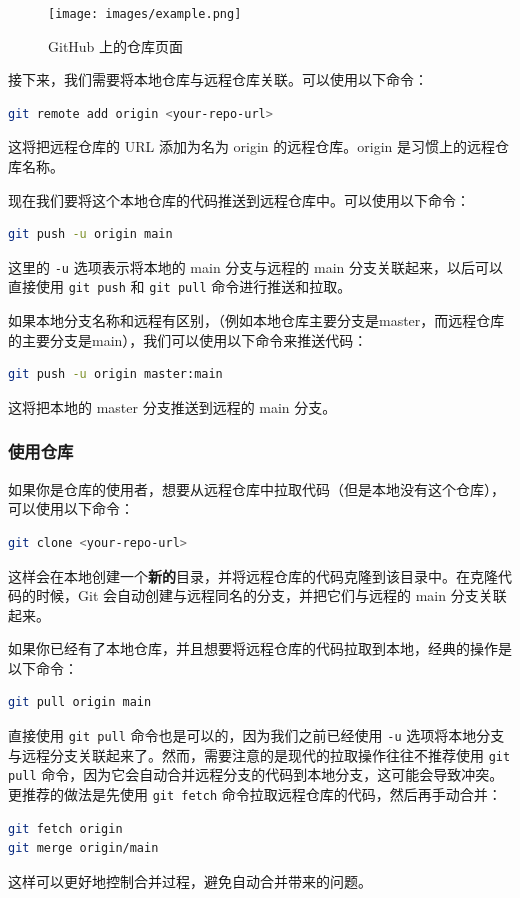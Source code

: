 \documentclass[../main.tex]{subfiles}
\begin{document}
\begin{figure}[htbp]
\centering
\texttt{[image: images/example.png]}
\caption{GitHub 上的仓库页面}
\label{fig:github-repo}
\end{figure}

接下来，我们需要将本地仓库与远程仓库关联。可以使用以下命令：
\begin{lstlisting}[language=bash]
git remote add origin <your-repo-url>
\end{lstlisting}
这将把远程仓库的 URL 添加为名为 origin 的远程仓库。origin 是习惯上的远程仓库名称。

现在我们要将这个本地仓库的代码推送到远程仓库中。可以使用以下命令：
\begin{lstlisting}[language=bash]
git push -u origin main
\end{lstlisting}
这里的 \texttt{-u} 选项表示将本地的 main 分支与远程的 main 分支关联起来，以后可以直接使用 \texttt{git push} 和 \texttt{git pull} 命令进行推送和拉取。

如果本地分支名称和远程有区别，（例如本地仓库主要分支是master，而远程仓库的主要分支是main），我们可以使用以下命令来推送代码：
\begin{lstlisting}[language=bash]
git push -u origin master:main
\end{lstlisting}
这将把本地的 master 分支推送到远程的 main 分支。

\subsubsection{使用仓库}

如果你是仓库的使用者，想要从远程仓库中拉取代码（但是本地没有这个仓库），可以使用以下命令：

\begin{lstlisting}[language=bash]
git clone <your-repo-url>
\end{lstlisting}

这样会在本地创建一个\textbf{新的}目录，并将远程仓库的代码克隆到该目录中。在克隆代码的时候，Git 会自动创建与远程同名的分支，并把它们与远程的 main 分支关联起来。

如果你已经有了本地仓库，并且想要将远程仓库的代码拉取到本地，经典的操作是以下命令：
\begin{lstlisting}[language=bash]
git pull origin main
\end{lstlisting}
直接使用 \texttt{git pull} 命令也是可以的，因为我们之前已经使用 \texttt{-u} 选项将本地分支与远程分支关联起来了。然而，需要注意的是现代的拉取操作往往不推荐使用 \texttt{git pull} 命令，因为它会自动合并远程分支的代码到本地分支，这可能会导致冲突。更推荐的做法是先使用 \texttt{git fetch} 命令拉取远程仓库的代码，然后再手动合并：
\begin{lstlisting}[language=bash]
git fetch origin
git merge origin/main
\end{lstlisting}
这样可以更好地控制合并过程，避免自动合并带来的问题。
\end{document}

